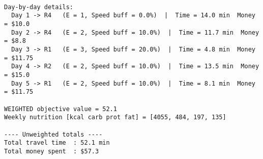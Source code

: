 \fontsize{10}{10}\selectfont

\begin{verbatim}

Day‑by‑day details:
  Day 1 -> R4   (E = 1, Speed buff = 0.0%)  |  Time = 14.0 min  Money = $10.0
  Day 2 -> R4   (E = 2, Speed buff = 10.0%)  |  Time = 11.7 min  Money = $8.8
  Day 3 -> R1   (E = 3, Speed buff = 20.0%)  |  Time = 4.8 min  Money = $11.75
  Day 4 -> R2   (E = 2, Speed buff = 10.0%)  |  Time = 13.5 min  Money = $15.0
  Day 5 -> R1   (E = 2, Speed buff = 10.0%)  |  Time = 8.1 min  Money = $11.75

WEIGHTED objective value = 52.1
Weekly nutrition [kcal carb prot fat] = [4055, 484, 197, 135]

---- Unweighted totals ----
Total travel time  : 52.1 min
Total money spent  : $57.3

\end{verbatim}